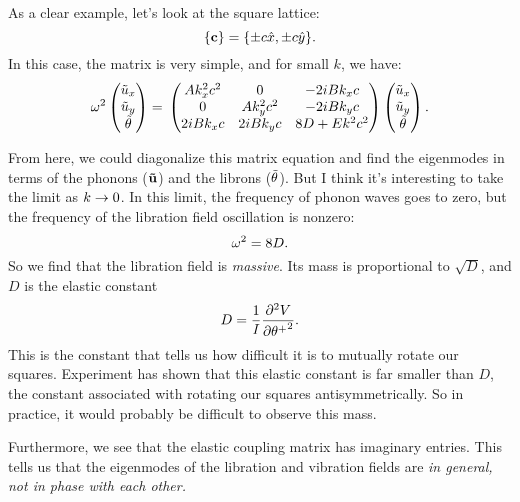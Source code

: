 \documentclass[12pt]{article}
\begin{document}
As a clear example, let's look at the square lattice:
\[ \{ \mathbf{c} \} = \{ \pm c \hat x, \pm c \hat y \}.\]
In this case, the matrix is very simple, and for small $k$, we have:
\[  \omega^2 \left(\begin{matrix} \tilde u_x \\ \tilde u_y \\ \tilde {\theta}\end{matrix}\right) = \\ \left(\begin{matrix} Ak_x^2c^2 & 0 & - 2i B k_x c \\ 0 & Ak_y^2 c^2 & -2iBk_y c \\ 2i B k_x c & 2i B k_y c & 8D + Ek^2c^2\end{matrix}\right) \left(\begin{matrix} \tilde u_x \\ \tilde u_y \\ \tilde {\theta}\end{matrix}\right).  \]

From here, we could diagonalize this matrix equation and find the eigenmodes in terms of the phonons ($\mathbf{\tilde u}$) and the librons ($\tilde {\theta}$). But I think it's interesting to take the limit as $k\rightarrow 0$. In this limit, the frequency of phonon waves goes to zero, but the frequency of the libration field oscillation is nonzero:
\[ \omega^2= 8D.\]
So we find that the libration field is \emph{massive}. Its mass is proportional to $\sqrt{D}$, and $D$ is the elastic constant
\[ D = \frac{1}{I}\frac{\partial^2 {V}}{\partial {\theta^+}^2}.\]
This is the constant that tells us how difficult it is to mutually rotate our squares. Experiment has shown that this elastic constant is far smaller than $D$, the constant associated with rotating our squares antisymmetrically. So in practice, it would probably be difficult to observe this mass.

Furthermore, we see that the elastic coupling matrix has imaginary entries. This tells us that the eigenmodes of the libration and vibration fields are \emph{in general, not in phase with each other.}
\end{document}
